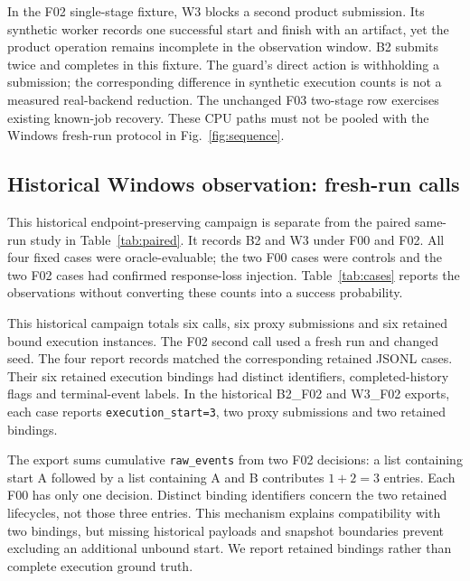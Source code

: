 \documentclass{ieeeaccess}
\begin{document}
In the F02 single-stage fixture, W3 blocks a second product submission. Its
synthetic worker records one successful start
and finish with an artifact, yet the product operation remains incomplete in
the observation window. B2 submits twice and completes in this fixture. The
guard's direct action is withholding a submission; the corresponding difference
in synthetic execution counts is not a measured real-backend reduction. The
unchanged F03 two-stage row exercises existing known-job recovery. These CPU
paths must not be pooled with the Windows fresh-run protocol in
Fig.~\ref{fig:sequence}.

\subsection{Historical Windows observation: fresh-run calls}

This historical endpoint-preserving campaign is separate from the paired
same-run study in Table~\ref{tab:paired}. It records B2 and W3 under F00 and
F02. All four fixed cases were oracle-evaluable; the two F00 cases were controls
and the two F02 cases had confirmed response-loss injection. Table~\ref{tab:cases} reports
the observations without converting these counts into a success probability.


\begin{table}[t]
\caption{Historical four-case fresh-run campaign, not the paired same-run study
in Table~\ref{tab:paired}. S/E are
proxy submissions/bound execution instances; U/R are unresolved/resolved
research-client calls. All four cases were oracle-evaluable.}
\label{tab:cases}
\centering

\end{table}

This historical campaign totals six calls, six proxy submissions and six
retained bound execution instances. The F02 second call used a fresh run and
changed seed.
The four report records matched the corresponding retained JSONL cases.
Their six retained execution bindings had distinct identifiers, completed-history
flags and terminal-event labels. In the historical B2\_F02 and W3\_F02
exports, each case reports
\texttt{execution\_start=3}, two proxy submissions and two retained bindings.

The export sums cumulative \texttt{raw\_events} from two F02 decisions: a
list containing start A followed by a list containing A and B contributes
$1+2=3$ entries. Each F00 has only one decision. Distinct binding identifiers
concern the two retained lifecycles, not those three entries. This mechanism
explains compatibility with two bindings, but missing historical payloads and
snapshot boundaries prevent excluding an additional unbound start. We report
retained bindings rather than complete execution ground truth.
\end{document}
